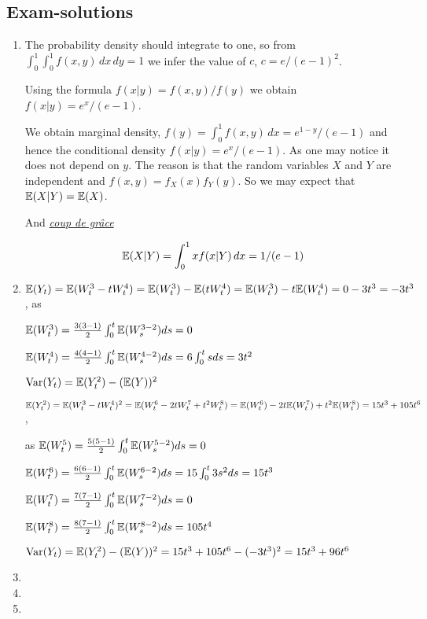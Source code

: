 \documentclass[12pt, a4paper]{article}
\begin{document}
\subsection{Exam-solutions}
\begin{enumerate}
\item The probability density should integrate to one, so from $\int_0^1 \int_0^1 f(x,y) \, dx\, dy=1$ we infer the value of $c$, $c=e/(e-1)^2$.

Using the formula $f(x|y)=f(x,y)/f(y)$ we obtain $f(x|y)=e^x/(e-1)$.

We obtain marginal density, $f(y)=\int_0^1 f(x,y) \, dx= e^{1-y}/(e-1)$ and hence the conditional density $f(x|y)=e^x/(e-1)$. As one may notice it does not depend on $y$. The reason is that the random variables $X$ and $Y$ are independent and $f(x,y)=f_X(x)f_Y(y)$. So we may expect that $\mathbb{E}(X|Y)=\mathbb{E}(X)$.

And \href{http://en.wikipedia.org/wiki/Coup_de_gr%C3%A2ce}{\textit{coup de grâce}}

\[
\mathbb{E}(X|Y)=\int_0^1 x f(x|Y) \, dx = 1/(e-1)
\]


\item $\mathbb{E}(Y_t)=\mathbb{E}(W^3_t-tW^4_t) = \mathbb{E}(W^3_t)-\mathbb{E}(tW^4_t) = \mathbb{E}(W^3_t)-t \mathbb{E}(W^4_t)= 0 - 3t^3 = - 3t^3 $, as

$\mathbb{E}(W^{3}_{t})= \frac{3(3-1)}{2} \int_{0}^{t} \mathbb{E} (W^{3-2}_{s}) ds = 0 $

$\mathbb{E}(W^{4}_{t})= \frac{4(4-1)}{2} \int_{0}^{t} \mathbb{E} (W^{4-2}_{s}) ds = 6 \int_{0}^{t} s ds =3 t^2 $

$\operatorname{Var}(Y_t) =\mathbb{E}(Y^2_t)-(\mathbb{E}(Y))^2$

$\mathbb{E}(Y^2_t)=\mathbb{E}(W^3_t-tW^4_t)^2=\mathbb{E}(W^6_t-2tW^7_t+t^2 W^8_t)= \mathbb{E}(W^6_t)-2t\mathbb{E}(W^7_t)+t^2 \mathbb{E}(W^8_t) = 15t^3 + 105t^6$,

as $\mathbb{E}(W^{5}_{t})= \frac{5(5-1)}{2} \int_{0}^{t} \mathbb{E} (W^{5-2}_{s}) ds = 0 $

$\mathbb{E}(W^{6}_{t})= \frac{6(6-1)}{2} \int_{0}^{t} \mathbb{E} (W^{6-2}_{s}) ds = 15 \int_{0}^{t} 3s^2 ds= 15t^3 $

$\mathbb{E}(W^{7}_{t})= \frac{7(7-1)}{2} \int_{0}^{t} \mathbb{E} (W^{7-2}_{s}) ds = 0 $

$\mathbb{E}(W^{8}_{t})= \frac{8(7-1)}{2} \int_{0}^{t} \mathbb{E} (W^{8-2}_{s}) ds = 105t^4 $

$\operatorname{Var}(Y_t) =\mathbb{E}(Y^2_t)-(\mathbb{E}(Y))^2 = 15t^3 + 105t^6 - (-3t^3)^2= 15t^3 + 96 t^6$

\item

\item

\item


\end{enumerate}
\end{document}
